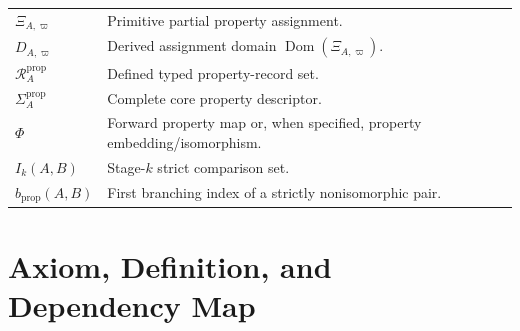 \documentclass[11pt]{article}
\newcommand{\Dom}{\operatorname{Dom}}
\newcommand{\PropRec}{\mathcal R^{\mathrm{prop}}}
\theoremstyle{definition}
\theoremstyle{remark}
\begin{document}
\begin{tabularx}{\textwidth}{@{}>{\raggedright\arraybackslash}p{}X@{}}
\(\Xi_{A,\varpi}\) & Primitive partial property assignment.\\
\(D_{A,\varpi}\) & Derived assignment domain \(\Dom(\Xi_{A,\varpi})\).\\
\(\PropRec_A\) & Defined typed property-record set.\\
\(\Sigma_A^{\mathrm{prop}}\) & Complete core property descriptor.\\
\(\Phi\) & Forward property map or, when specified, property embedding/isomorphism.\\
\(I_k(A,B)\) & Stage-\(k\) strict comparison set.\\
\(b_{\mathrm{prop}}(A,B)\) & First branching index of a strictly nonisomorphic pair.\\
\bottomrule
\end{tabularx}

\section{Axiom, Definition, and Dependency Map}
\label{app:dependency-map}
\end{document}
